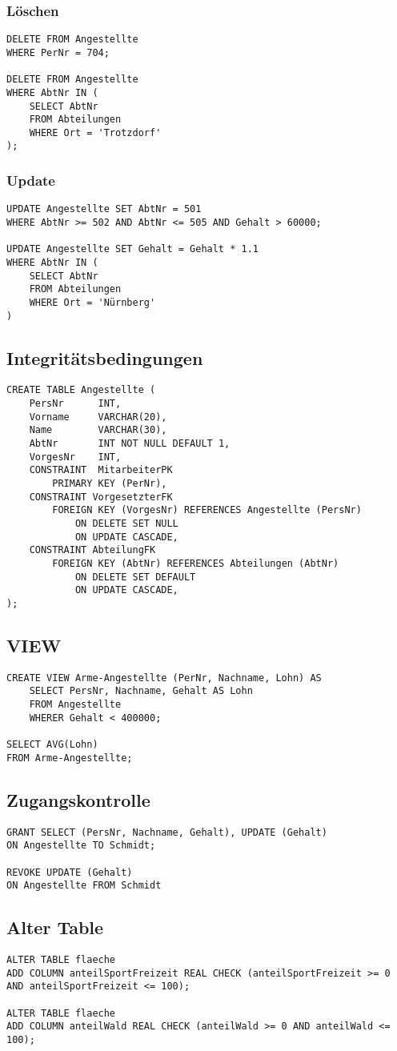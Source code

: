 \subsubsection{Löschen}
\begin{verbatim}
DELETE FROM Angestellte
WHERE PerNr = 704;

DELETE FROM Angestellte
WHERE AbtNr IN (
	SELECT AbtNr
	FROM Abteilungen
	WHERE Ort = 'Trotzdorf'
);
\end{verbatim}
\subsubsection{Update}
\begin{verbatim}
UPDATE Angestellte SET AbtNr = 501
WHERE AbtNr >= 502 AND AbtNr <= 505 AND Gehalt > 60000;

UPDATE Angestellte SET Gehalt = Gehalt * 1.1
WHERE AbtNr IN (
	SELECT AbtNr
	FROM Abteilungen
	WHERE Ort = 'Nürnberg'
)
\end{verbatim}
\subsection{Integritätsbedingungen}
\begin{verbatim}
CREATE TABLE Angestellte (
	PersNr		INT,
	Vorname 	VARCHAR(20),
	Name		VARCHAR(30),
	AbtNr		INT NOT NULL DEFAULT 1,
	VorgesNr	INT,
	CONSTRAINT	MitarbeiterPK
		PRIMARY KEY (PerNr),
	CONSTRAINT VorgesetzterFK
		FOREIGN KEY (VorgesNr) REFERENCES Angestellte (PersNr)
			ON DELETE SET NULL
			ON UPDATE CASCADE,
	CONSTRAINT AbteilungFK
		FOREIGN KEY (AbtNr) REFERENCES Abteilungen (AbtNr)
			ON DELETE SET DEFAULT
			ON UPDATE CASCADE,
);
\end{verbatim}
\subsection{VIEW}
\begin{verbatim}
CREATE VIEW Arme-Angestellte (PerNr, Nachname, Lohn) AS
	SELECT PersNr, Nachname, Gehalt AS Lohn
	FROM Angestellte
	WHERER Gehalt < 400000;
	
SELECT AVG(Lohn)
FROM Arme-Angestellte;
\end{verbatim}
\subsection{Zugangskontrolle}
\begin{verbatim}
GRANT SELECT (PersNr, Nachname, Gehalt), UPDATE (Gehalt)
ON Angestellte TO Schmidt;

REVOKE UPDATE (Gehalt)
ON Angestellte FROM Schmidt
\end{verbatim}
\subsection{Alter Table}
\begin{verbatim}
ALTER TABLE flaeche
ADD COLUMN anteilSportFreizeit REAL CHECK (anteilSportFreizeit >= 0 AND anteilSportFreizeit <= 100);

ALTER TABLE flaeche
ADD COLUMN anteilWald REAL CHECK (anteilWald >= 0 AND anteilWald <= 100);
\end{verbatim}











